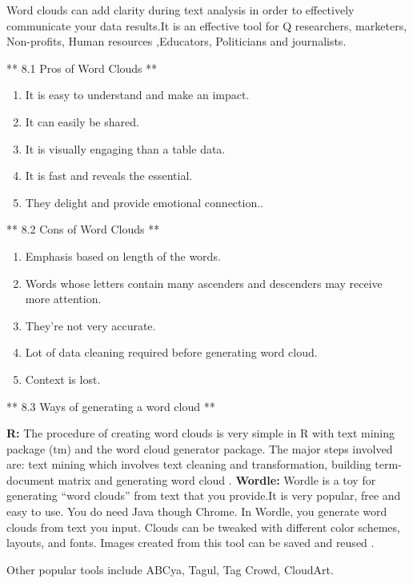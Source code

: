 \documentclass[]{book}
\providecommand{\tightlist}{%
  \setlength{\itemsep}{0pt}\setlength{\parskip}{0pt}}
\theoremstyle{definition}
\theoremstyle{definition}
\theoremstyle{definition}
\theoremstyle{remark}
\begin{document}
Word clouds can add clarity during text analysis in order to effectively
communicate your data results.It is an effective tool for Q researchers,
marketers, Non-profits, Human resources ,Educators, Politicians and
journalists.

** 8.1 Pros of Word Clouds **

\begin{enumerate}
\def\labelenumi{\arabic{enumi}.}
\tightlist
\item
  It is easy to understand and make an impact.
\item
  It can easily be shared.
\item
  It is visually engaging than a table data.
\item
  It is fast and reveals the essential.
\item
  They delight and provide emotional connection..
\end{enumerate}

** 8.2 Cons of Word Clouds **

\begin{enumerate}
\def\labelenumi{\arabic{enumi}.}
\tightlist
\item
  Emphasis based on length of the words.
\item
  Words whose letters contain many ascenders and descenders may receive
  more attention.
\item
  They're not very accurate.
\item
  Lot of data cleaning required before generating word cloud.
\item
  Context is lost.
\end{enumerate}

\citep{wordcloud}

** 8.3 Ways of generating a word cloud **

\textbf{R:} The procedure of creating word clouds is very simple in R
with text mining package (tm) and the word cloud generator package. The
major steps involved are: text mining which involves text cleaning and
transformation, building term-document matrix and generating word cloud
\citep{r}. \textbf{Wordle:} Wordle is a toy for generating ``word
clouds'' from text that you provide.It is very popular, free and easy to
use. You do need Java though Chrome. In Wordle, you generate word clouds
from text you input. Clouds can be tweaked with different color schemes,
layouts, and fonts. Images created from this tool can be saved and
reused \citep{wordle}.

Other popular tools include ABCya, Tagul, Tag Crowd, CloudArt.
\end{document}
